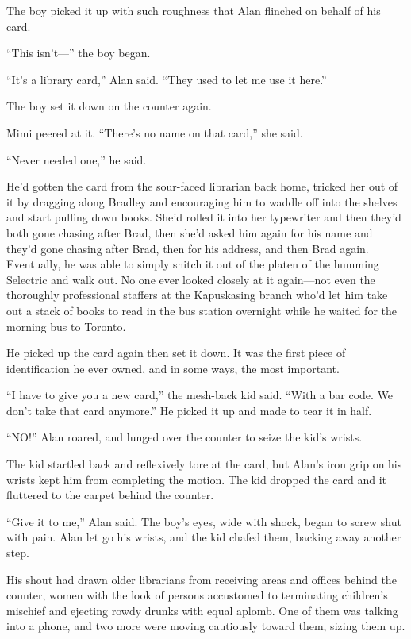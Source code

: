 \documentclass{article}
\begin{document}
The boy picked it up with such roughness that Alan flinched on behalf
of his card.

``This isn't---'' the boy began.

``It's a library card,'' Alan said.  ``They used to let me use it
here.''

The boy set it down on the counter again.

Mimi peered at it.  ``There's no name on that card,'' she said.

``Never needed one,'' he said.

He'd gotten the card from the sour-faced librarian back home, tricked
her out of it by dragging along Bradley and encouraging him to waddle
off into the shelves and start pulling down books.  She'd rolled it
into her typewriter and then they'd both gone chasing after Brad, then
she'd asked him again for his name and they'd gone chasing after Brad,
then for his address, and then Brad again.  Eventually, he was able to
simply snitch it out of the platen of the humming Selectric and walk
out.  No one ever looked closely at it again---not even the thoroughly
professional staffers at the Kapuskasing branch who'd let him take out
a stack of books to read in the bus station overnight while he waited
for the morning bus to Toronto.

He picked up the card again then set it down.  It was the first piece
of identification he ever owned, and in some ways, the most important.

``I have to give you a new card,'' the mesh-back kid said.  ``With a
bar code.  We don't take that card anymore.'' He picked it up and made
to tear it in half.

``NO!'' Alan roared, and lunged over the counter to seize the kid's
wrists.

The kid startled back and reflexively tore at the card, but Alan's
iron grip on his wrists kept him from completing the motion.  The kid
dropped the card and it fluttered to the carpet behind the counter.

``Give it to me,'' Alan said.  The boy's eyes, wide with shock, began
to screw shut with pain.  Alan let go his wrists, and the kid chafed
them, backing away another step.

His shout had drawn older librarians from receiving areas and offices
behind the counter, women with the look of persons accustomed to
terminating children's mischief and ejecting rowdy drunks with equal
aplomb.  One of them was talking into a phone, and two more were
moving cautiously toward them, sizing them up.
\end{document}
